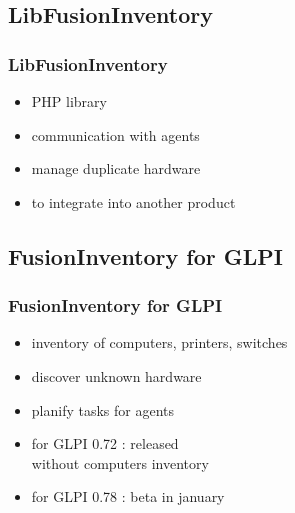 \documentclass{beamer}
\begin{document}
\subsection{LibFusionInventory}

\begin{frame}
\frametitle{LibFusionInventory}

\begin{itemize}
%
\item PHP library
\item communication with agents
\item manage duplicate hardware
\item to integrate into another product
%
\end{itemize}
\end{frame}
\subsection{FusionInventory for GLPI}


\begin{frame}
\frametitle{FusionInventory for GLPI}

\begin{itemize}

\item inventory of computers, printers, switches
\item discover unknown hardware
\item planify tasks for agents
\item for GLPI 0.72 : released \\ without computers inventory
\item for GLPI 0.78 : beta in january

\end{itemize}
\end{frame}
\end{document}
